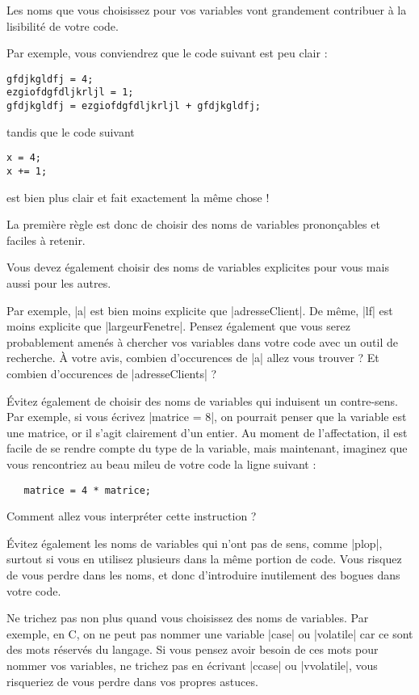 Les noms que vous choisissez pour vos variables vont grandement contribuer à la lisibilité de votre code.

Par exemple, vous conviendrez que le code suivant est peu clair :
\begin{lstlisting}
gfdjkgldfj = 4;
ezgiofdgfdljkrljl = 1;
gfdjkgldfj = ezgiofdgfdljkrljl + gfdjkgldfj;
\end{lstlisting}
tandis que le code suivant
\begin{lstlisting}
x = 4;
x += 1;
\end{lstlisting}
est bien plus clair et fait exactement la même chose !

La première règle est donc de choisir des noms de variables prononçables et faciles à retenir.

Vous devez également choisir des noms de variables explicites pour vous mais aussi pour les autres.

Par exemple, |a| est bien moins explicite que |adresseClient|. De même, |lf| est moins explicite que
|largeurFenetre|. Pensez également que vous serez probablement amenés à chercher vos variables dans votre code
avec un outil de recherche. À votre avis, combien d'occurences de |a| allez vous trouver ? Et combien
d'occurences de |adresseClients| ?

\'Evitez également de choisir des noms de variables qui induisent un contre-sens. Par exemple, si vous écrivez
|matrice = 8|, on pourrait penser que la variable est une matrice, or il s'agit clairement d'un entier. Au moment
de l'affectation, il est facile de se rendre compte du type de la variable, mais maintenant, imaginez que vous
rencontriez au beau mileu de votre code la ligne suivant :
\begin{lstlisting}
   matrice = 4 * matrice;
\end{lstlisting}
Comment allez vous interpréter cette instruction ?

\'Evitez également les noms de variables qui n'ont pas de sens, comme |plop|, surtout si vous en utilisez plusieurs
dans la même portion de code. Vous risquez de vous perdre dans les noms, et donc d'introduire inutilement des
bogues dans votre code.

Ne trichez pas non plus quand vous choisissez des noms de variables. Par exemple, en C, on ne peut pas nommer une variable
|case| ou |volatile| car ce sont des mots réservés du langage. Si vous pensez avoir besoin de ces mots pour nommer vos
variables, ne trichez pas en écrivant |ccase| ou |vvolatile|, vous risqueriez de vous perdre dans vos propres astuces.

